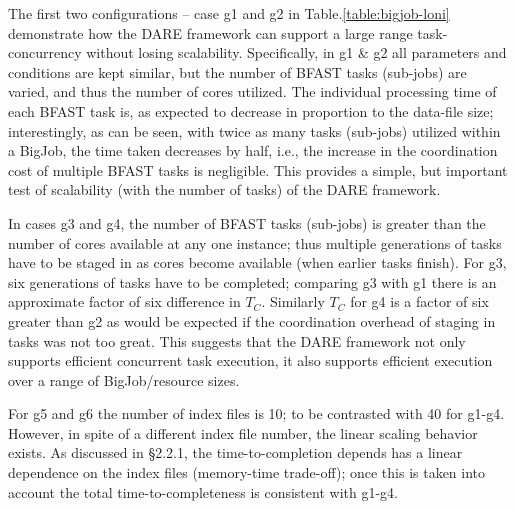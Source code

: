 \documentclass{sig-alternate}
\begin{document}
The first two configurations -- case g1 and g2 in
Table.\ref{table:bigjob-loni} demonstrate how the DARE framework can
support a large range task-concurrency without losing scalability.
Specifically, in g1 \& g2 all parameters and conditions are kept
similar, but the number of BFAST tasks (sub-jobs) are varied, and thus
the number of cores utilized.  The individual processing time of each
BFAST task is, as expected to decrease in proportion to the data-file
size; interestingly, as can be seen, with twice as many tasks
(sub-jobs) utilized within a BigJob, the time taken decreases by half,
i.e., the increase in the coordination cost of multiple BFAST tasks is
negligible. This provides a simple, but important test of scalability
(with the number of tasks) of the DARE framework.  

In cases g3 and g4, the number of BFAST tasks (sub-jobs) is greater
than the number of cores available at any one instance; thus multiple
generations of tasks have to be staged in as cores become available
(when earlier tasks finish).  For g3, six generations of tasks have to
be completed; comparing g3 with g1 there is an approximate factor of
six difference in $T_C$. Similarly $T_C$ for g4 is a factor of six
greater than g2 as would be expected if the coordination overhead of
staging in tasks was not too great. This suggests that the DARE
framework not only supports efficient concurrent task execution, it
also supports efficient execution over a range of BigJob/resource
sizes.

For g5 and g6 the number of index files is 10; to be contrasted with
40 for g1-g4.  However, in spite of a different index file number, the
linear scaling behavior exists.  As discussed in \S 2.2.1, the
time-to-completion depends has a linear dependence on the index files
(memory-time trade-off); once this is taken into account the total
time-to-completeness is consistent with g1-g4.
\end{document}
